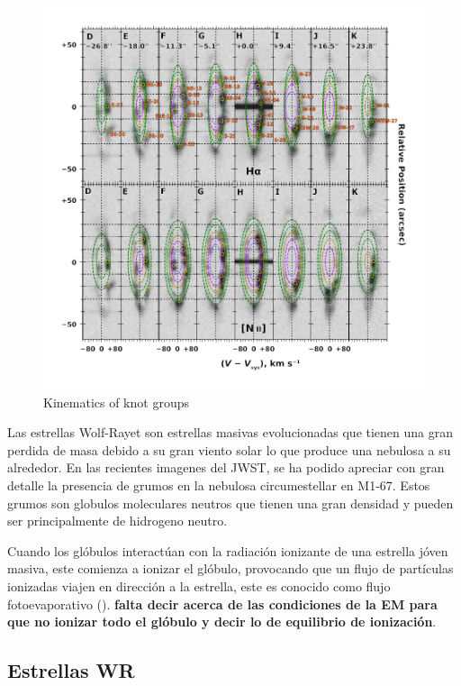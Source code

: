 \documentclass[twocolumn, times]{aastex631}
\begin{document}
\begin{figure}
  \centering
  \includegraphics[width=\linewidth]{figs/zavala-slit-spectra-select-annotated}
  \caption{Kinematics of knot groups}
  \label{fig:longslit-spectra}
\end{figure}

Las estrellas Wolf-Rayet son estrellas masivas evolucionadas que tienen una gran perdida de masa debido a su gran viento solar lo que produce una nebulosa a su alrededor. En las recientes imagenes del JWST, se ha podido apreciar con gran detalle la presencia de grumos en la nebulosa circumestellar en M1-67. Estos grumos son globulos moleculares neutros que tienen una gran densidad y pueden ser principalmente de hidrogeno neutro. 

Cuando los glóbulos interactúan con la radiación ionizante de una estrella jóven masiva, este comienza a ionizar el glóbulo, provocando que un flujo de partículas ionizadas viajen en dirección a la estrella, este es conocido como flujo fotoevaporativo (). \textbf{falta decir acerca de las condiciones de la EM para que no ionizar todo el glóbulo y decir lo de equilibrio de ionización}.

\subsection{Estrellas WR}
\end{document}
